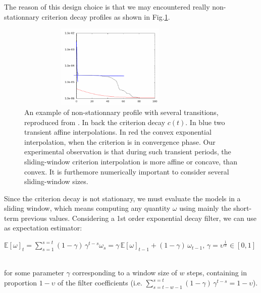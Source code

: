 \documentclass{article}
\newcommand{\eqline}[1]{\\\centerline{$#1$}\\}
\begin{document}
The reason of this design choice is that we may encountered really non-stationnary criterion decay profiles as shown in Fig.\ref{spurious-cost}.

\begin{figure}[!ht]
\centerline{\includegraphics[width=0.8\textwidth,height=4cm]{img/spurious-cost}}
  \caption{An example of non-stationnary profile with several transitions, reproduced from \cite{vieville:hal-01610735}. In back the criterion decay $c(t)$. In blue two transient affine interpolations. In red the convex exponential interpolation, when the criterion is in convergence phase. Our experimental observation is that during such transient periods, the sliding-window criterion interpolation is more affine or concave, than convex. It is furthemore numerically important to consider several sliding-window sizes.}
  \label{spurious-cost}
\end{figure}

Since the criterion decay is not stationary, we must evaluate the models in a sliding window, which means computing any quantity $\omega$ using mainly the short-term previous values. Considering a 1st order exponential decay filter, we can use as expectation estimator:
\eqline{\mathbb{E}[\omega]_{t} = \sum_{s=1}^{s=t} (1 - \gamma) \, \gamma^{t-s} \omega_s = \gamma \, \mathbb{E}[\omega]_{t - 1} + (1 - \gamma) \, \omega_{t-1} , \, \gamma = \upsilon^{\frac{1}{w}} \in [0, 1]}
for some parameter $\gamma$ corresponding to a window size of $w$ steps, containing in proportion $1 - \upsilon$ of the filter coefficients (i.e. $\sum_{s=t-w-1}^{s=t} (1 - \gamma) \, \gamma^{t-s} = 1 - \upsilon$). 
\end{document}
